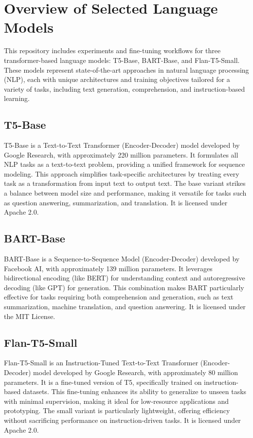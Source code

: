 \section{Overview of Selected Language Models}
This repository includes experiments and fine-tuning workflows for three transformer-based language models: T5-Base, BART-Base, and Flan-T5-Small. These models represent state-of-the-art approaches in natural language processing (NLP), each with unique architectures and training objectives tailored for a variety of tasks, including text generation, comprehension, and instruction-based learning.

\subsection{T5-Base}
T5-Base is a Text-to-Text Transformer (Encoder-Decoder) model developed by Google Research, with approximately 220 million parameters. It formulates all NLP tasks as a text-to-text problem, providing a unified framework for sequence modeling. This approach simplifies task-specific architectures by treating every task as a transformation from input text to output text. The base variant strikes a balance between model size and performance, making it versatile for tasks such as question answering, summarization, and translation. It is licensed under Apache 2.0.

\subsection{BART-Base}
BART-Base is a Sequence-to-Sequence Model (Encoder-Decoder) developed by Facebook AI, with approximately 139 million parameters. It leverages bidirectional encoding (like BERT) for understanding context and autoregressive decoding (like GPT) for generation. This combination makes BART particularly effective for tasks requiring both comprehension and generation, such as text summarization, machine translation, and question answering. It is licensed under the MIT License.

\subsection{Flan-T5-Small}
Flan-T5-Small is an Instruction-Tuned Text-to-Text Transformer (Encoder-Decoder) model developed by Google Research, with approximately 80 million parameters. It is a fine-tuned version of T5, specifically trained on instruction-based datasets. This fine-tuning enhances its ability to generalize to unseen tasks with minimal supervision, making it ideal for low-resource applications and prototyping. The small variant is particularly lightweight, offering efficiency without sacrificing performance on instruction-driven tasks. It is licensed under Apache 2.0.


